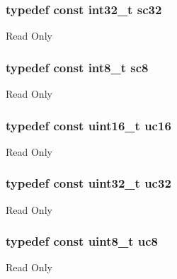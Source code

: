 \subsubsection[{\texorpdfstring{sc32}{sc32}}]{\setlength{\rightskip}{0pt plus 5cm}typedef const int32\+\_\+t {\bf sc32}}\hypertarget{group___exported__types_gad97679599f3791409523fdb1c6156a28}{}\label{group___exported__types_gad97679599f3791409523fdb1c6156a28}
Read Only 
\subsubsection[{\texorpdfstring{sc8}{sc8}}]{\setlength{\rightskip}{0pt plus 5cm}typedef const int8\+\_\+t {\bf sc8}}\hypertarget{group___exported__types_ga30e6c0f6718e1b6d26dc9d94ddcf9d11}{}\label{group___exported__types_ga30e6c0f6718e1b6d26dc9d94ddcf9d11}
Read Only 
\subsubsection[{\texorpdfstring{uc16}{uc16}}]{\setlength{\rightskip}{0pt plus 5cm}typedef const uint16\+\_\+t {\bf uc16}}\hypertarget{group___exported__types_gabc715ea3779494b5a4f53173a397f7cb}{}\label{group___exported__types_gabc715ea3779494b5a4f53173a397f7cb}
Read Only 
\subsubsection[{\texorpdfstring{uc32}{uc32}}]{\setlength{\rightskip}{0pt plus 5cm}typedef const uint32\+\_\+t {\bf uc32}}\hypertarget{group___exported__types_ga5b628e6a05856ff67e535fa391a57683}{}\label{group___exported__types_ga5b628e6a05856ff67e535fa391a57683}
Read Only 
\subsubsection[{\texorpdfstring{uc8}{uc8}}]{\setlength{\rightskip}{0pt plus 5cm}typedef const uint8\+\_\+t {\bf uc8}}\hypertarget{group___exported__types_gac74022c74a461f810e0d4fdc9bfea480}{}\label{group___exported__types_gac74022c74a461f810e0d4fdc9bfea480}
Read Only 
